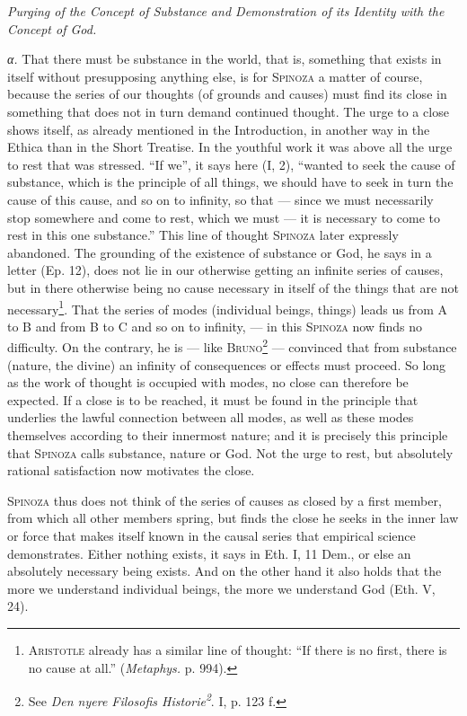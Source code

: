 \documentclass[12pt]{article}
\begin{document}
\begin{center}\textit{Purging of the Concept of Substance and Demonstration of its
Identity with the Concept of God.}\end{center}

\textit{α.} That there must be substance in the world, that is, something that exists
in itself without presupposing anything else, is for \textsc{Spinoza} a matter of
course, because the series of our thoughts (of grounds and causes) must find its close
in something that does not in turn demand continued thought. The urge to a close shows
itself, as already mentioned in the Introduction, in another way in the Ethica than in
the Short Treatise. In the youthful work it was above all the urge to rest that was
stressed. ``If we'', it says here (I, 2), ``wanted to seek the cause of substance,
which is the principle of all things, we should have to seek in turn the cause of this
cause, and so on to infinity, so that --- since we must necessarily stop somewhere and
come to rest, which we must --- it is necessary to come to rest in this one
substance.'' This line of thought \textsc{Spinoza} later expressly abandoned. The
grounding of the existence of substance or God, he says in a letter (Ep. 12), does not
lie in our otherwise getting an infinite series of causes, but in there otherwise
being no cause necessary in itself of the things that are not
necessary\footnote{\textsc{Aristotle} already has a similar line of thought: ``If
there is no first, there is no cause at all.'' (\textit{Metaphys.} p. 994).}. That the
series of modes (individual beings, things) leads us from A to B and from B to C and so
on to infinity, --- in this \textsc{Spinoza} now finds no difficulty. On the contrary,
he is --- like \textsc{Bruno}\footnote{See \textit{Den nyere Filosofis
Historie\textsuperscript{2}}. I, p. 123 f.} --- convinced that from substance (nature,
the divine) an infinity of consequences or effects must proceed. So long as the work of
thought is occupied with modes, no close can therefore be expected. If a close is to be
reached, it must be found in the principle that underlies the lawful connection between
all modes, as well as these modes themselves according to their innermost nature; and
it is precisely this principle that \textsc{Spinoza} calls substance, nature or God.
Not the urge to rest, but absolutely rational satisfaction now motivates the close.

\textsc{Spinoza} thus does not think of the series of causes as closed by a first
member, from which all other members spring, but finds the close he seeks in the inner
law or force that makes itself known in the causal series that empirical science
demonstrates. Either nothing exists, it says in Eth. I, 11 Dem., or else an absolutely
necessary being exists. And on the other hand it also holds that the more we understand
individual beings, the more we understand God (Eth. V, 24).
\end{document}
